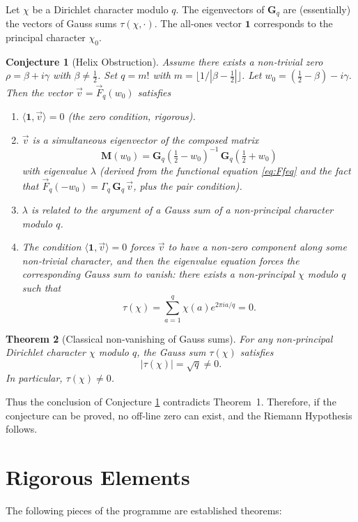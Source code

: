 \documentclass{article}
\newtheorem{theorem}{Theorem}[section]
\newtheorem{conjecture}[theorem]{Conjecture}
\theoremstyle{definition}
\begin{document}
Let \(\chi\) be a Dirichlet character modulo \(q\). The eigenvectors of \(\mathbf{G}_q\) are (essentially) the vectors of Gauss sums \(\tau(\chi,\cdot)\). The all‑ones vector \(\mathbf{1}\) corresponds to the principal character \(\chi_0\).

\begin{conjecture}[Helix Obstruction]\label{conj:main}
Assume there exists a non‑trivial zero \(\rho = \beta + i\gamma\) with \(\beta \neq \tfrac12\). Set \(q = m!\) with \(m = \lfloor 1/|\beta-\tfrac12|\rfloor\). Let \(w_0 = (\tfrac12-\beta) - i\gamma\). Then the vector \(\vec{v} = \vec{F}_q(w_0)\) satisfies
\begin{enumerate}
    \item \(\langle \mathbf{1}, \vec{v} \rangle = 0\) (the zero condition, rigorous).
    \item \(\vec{v}\) is a simultaneous eigenvector of the composed matrix 
    \[
    \mathbf{M}(w_0) = \mathbf{G}_q(\tfrac12 - w_0)^{-1}\, \mathbf{G}_q(\tfrac12 + w_0)
    \]
    with eigenvalue \(\lambda\) (derived from the functional equation \eqref{eq:Ffeq} and the fact that \(\vec{F}_q(-w_0) = \Gamma_q\, \mathbf{G}_q\, \vec{v}\), plus the pair condition).
    \item \(\lambda\) is related to the argument of a Gauss sum of a non‑principal character modulo \(q\).
    \item The condition \(\langle\mathbf{1}, \vec{v}\rangle = 0\) forces \(\vec{v}\) to have a non‑zero component along some non‑trivial character, and then the eigenvalue equation forces the corresponding Gauss sum to vanish: there exists a non‑principal \(\chi\) modulo \(q\) such that
    \[
    \tau(\chi) = \sum_{a=1}^q \chi(a) e^{2\pi i a/q} = 0.
    \]
\end{enumerate}
\end{conjecture}

\begin{theorem}[Classical non‑vanishing of Gauss sums]
For any non‑principal Dirichlet character \(\chi\) modulo \(q\), the Gauss sum \(\tau(\chi)\) satisfies
\[
|\tau(\chi)| = \sqrt{q} \neq 0.
\]
In particular, \(\tau(\chi) \neq 0\).
\end{theorem}

Thus the conclusion of Conjecture \ref{conj:main} contradicts Theorem~1. Therefore, if the conjecture can be proved, no off‑line zero can exist, and the Riemann Hypothesis follows.

\section{Rigorous Elements}
The following pieces of the programme are established theorems:
\end{document}
